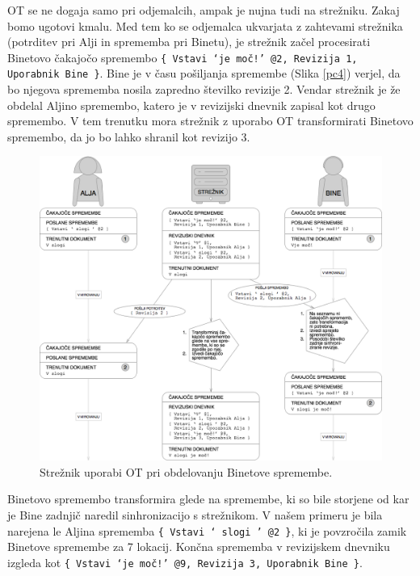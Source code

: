 \documentclass[a4paper, 12pt, twoside]{book}
\begin{document}
\pagebreak

OT se ne dogaja samo pri odjemalcih, ampak je nujna tudi na strežniku. Zakaj bomo ugotovi kmalu. Med tem ko se odjemalca ukvarjata z zahtevami strežnika (potrditev pri Alji in sprememba pri Binetu), je strežnik začel procesirati Binetovo čakajočo spremembo {\tt \{ Vstavi ‘je moč!’ @2, Revizija 1, Uporabnik Bine \}}. Bine je v času pošiljanja spremembe (Slika \ref{pc4}) verjel, da bo njegova sprememba nosila zapredno številko revizije 2. Vendar strežnik je že obdelal Aljino spremembo, katero je v revizijski dnevnik zapisal kot drugo spremembo. V tem trenutku mora strežnik z uporabo OT transformirati Binetovo spremembo, da jo bo lahko shranil kot revizijo 3.

\begin{figure}[placement h]
\begin{center}
\includegraphics[width=14cm]{pc5.png}
\end{center}
\caption{Strežnik uporabi OT pri obdelovanju Binetove spremembe.}
\label{pc5}
\end{figure}

Binetovo spremembo transformira glede na spremembe, ki so bile storjene od kar je Bine zadnjič naredil sinhronizacijo s strežnikom. V našem primeru je bila narejena le Aljina sprememba {\tt \{ Vstavi ‘ slogi ’ @2 \}}, ki je povzročila zamik Binetove spremembe za 7 lokacij. Končna sprememba v revizijskem dnevniku izgleda kot {\tt \{ Vstavi ‘je moč!’ @9, Revizija 3, Uporabnik Bine \}}.
\end{document}
